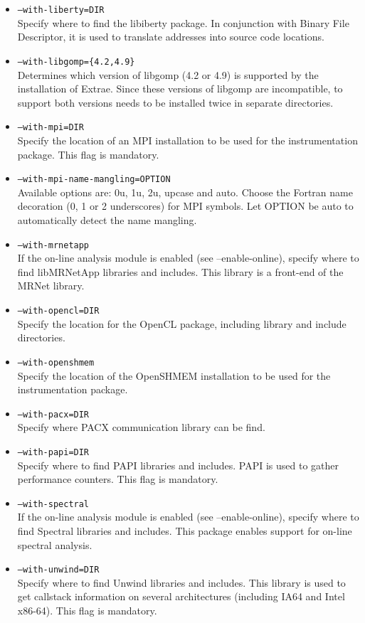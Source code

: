 \begin{itemize}
	\item {\tt --with-liberty=DIR} \\
	Specify where to find the libiberty package. In conjunction with Binary File Descriptor, it is used to translate addresses into source code locations.
	\item {\tt --with-libgomp=\{4.2,4.9\}}\\
	Determines which version of libgomp (4.2 or 4.9) is supported by the installation of Extrae. Since these versions of libgomp are incompatible, to support both versions \TRACE needs to be installed twice in separate directories.
	\item {\tt --with-mpi=DIR} \\
	Specify the location of an MPI installation to be used for the instrumentation package. This flag is mandatory.
	\item {\tt --with-mpi-name-mangling=OPTION} \\
	Available options are: 0u, 1u, 2u, upcase and auto. Choose the Fortran name decoration (0, 1 or 2 underscores) for MPI symbols. Let OPTION be auto to automatically detect the name mangling.
        \item {\tt --with-mrnetapp} \\
        If the on-line analysis module is enabled (see --enable-online), specify where to find libMRNetApp libraries and includes. This library is a front-end of the MRNet library. 
	\item {\tt --with-opencl=DIR} \\
	Specify the location for the OpenCL package, including library and include directories.
        \item {\tt --with-openshmem} \\
        Specify the location of the OpenSHMEM installation to be used for the instrumentation package. 
	\item {\tt --with-pacx=DIR} \\
	Specify where PACX communication library can be find.
	\item {\tt --with-papi=DIR} \\
	Specify where to find PAPI libraries and includes. PAPI is used to gather performance counters. This flag is mandatory.
        \item {\tt --with-spectral} \\
        If the on-line analysis module is enabled (see --enable-online), specify where to find Spectral libraries and includes. This package enables support for on-line spectral analysis.
	\item {\tt --with-unwind=DIR} \\
	Specify where to find Unwind libraries and includes. This library is used to get callstack information on several architectures (including IA64 and Intel x86-64). This flag is mandatory.
\end{itemize}

